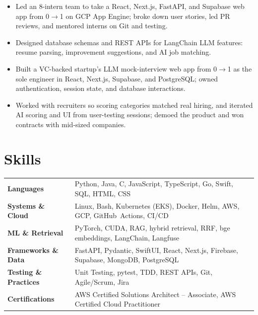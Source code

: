 \documentclass[11pt, letterpaper]{article}
\begin{document}
\vspace{1pt}
\begin{itemize}
  \item Led an 8-intern team to take a React, Next.js, FastAPI, and Supabase web app from 0$\to$1 on GCP App Engine; broke down user stories, led PR reviews, and mentored interns on Git and testing.
  \item Designed database schemas and REST APIs for LangChain LLM features: resume parsing, improvement suggestions, and AI job matching.
\end{itemize}

\vspace{1pt}
\begin{itemize}
  \item Built a VC-backed startup's LLM mock-interview web app from 0$\to$1 as the sole engineer in React, Next.js, Supabase, and PostgreSQL; owned authentication, session state, and database interactions.
  \item Worked with recruiters so scoring categories matched real hiring, and iterated AI scoring and UI from user-testing sessions; demoed the product and won contracts with mid-sized companies.
\end{itemize}

\section{Skills}
\begin{tabularx}{\textwidth}{@{}l @{\hspace{7pt}} >{\raggedright\arraybackslash}X@{}}
  \textbf{Languages} & Python, Java, C, JavaScript, TypeScript, Go, Swift, SQL, HTML, CSS \\[1pt]
  \textbf{Systems \& Cloud} & Linux, Bash, Kubernetes (EKS), Docker, Helm, AWS, GCP, GitHub~Actions, CI/CD \\[1pt]
  \textbf{ML \& Retrieval} & PyTorch, CUDA, RAG, hybrid retrieval, RRF, bge embeddings, LangChain, Langfuse \\[1pt]
  \textbf{Frameworks \& Data} & FastAPI, Pydantic, SwiftUI, React, Next.js, Firebase, Supabase, MongoDB, PostgreSQL \\[1pt]
  \textbf{Testing \& Practices} & Unit Testing, pytest, TDD, REST APIs, Git, Agile/Scrum, Jira \\[1pt]
  \textbf{Certifications} & AWS Certified Solutions Architect -- Associate, AWS Certified Cloud Practitioner \\
\end{tabularx}
\end{document}
